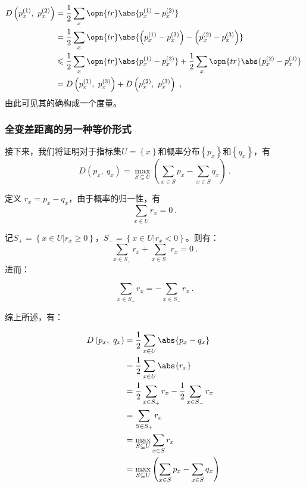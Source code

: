 \begin{equation}
\begin{aligned}
D\left(p_x^{(1)},~p_x^{(2)}\right) &= \frac{1}{2}\sum_x\opn{tr}\abs{p_x^{(1)} - p_x^{(2)}} \\
&= \frac{1}{2}\sum_x\opn{tr}\abs{\left(p_x^{(1)} - p_x^{(3)}\right) - \left(p_x^{(2)} - p_x^{(3)}\right)} \\
&\leqslant\frac{1}{2}\sum_x\opn{tr}\abs{p_x^{(1)} - p_x^{(3)}} + \frac{1}{2}\sum_x\opn{tr}\abs{p_x^{(2)} - p_x^{(3)}} \\
&=D\left(p_x^{(1)},~p_x^{(3)}\right)+D\left(p_x^{(2)},~p_x^{(3)}\right)~,
\end{aligned}~
\end{equation}
由此可见其的确构成一个度量。

\subsubsection{全变差距离的另一种等价形式}

接下来，我们将证明对于指标集$U = \left\{x\right\}$和概率分布$\left\{p_x\right\}$和$\left\{q_x\right\}$，有
\begin{equation}\label{eq_Trdist_2}
D\left(p_x,~q_x\right) = \max_{S \subseteq U}\left(\sum_{x\in S}p_x - \sum_{x\in S}q_x\right)~.
\end{equation}

定义 $r_x = p_x - q_x$，由于概率的归一性，有
\begin{equation}
\sum\limits_{x\in U}r_x = 0~.
\end{equation}


记$S_+ = \left\{x \in U | r_x \geqslant 0\right\}$，$S_- = \left\{x \in U | r_x < 0\right\}$。则有：
\begin{equation}
\sum_{x\in S_+}r_x + \sum_{x\in S_-}r_x = 0~.
\end{equation}
进而：

\begin{equation}
\sum_{x\in S_+}r_x = -\sum_{x\in S_-}r_x~.
\end{equation}

综上所述，有：

\begin{equation}
\begin{aligned}
D\left(p_x,~q_x\right) &= \frac{1}{2}\sum_{x\in U}\abs{p_x - q_x} \\
&= \frac{1}{2}\sum_{x\in U}\abs{r_x} \\
&= \frac{1}{2}\sum_{x\in S_+}r_x - \frac{1}{2}\sum_{x\in S_-}r_x \\
&= \sum_{S\in S_+}r_x \\
&= \max_{S \subseteq U}\sum_{x\in S}r_x \\
&= \max_{S\subseteq U}\left(\sum_{x\in S}p_x - \sum_{x\in S}q_x\right)
\end{aligned}~
\end{equation}


